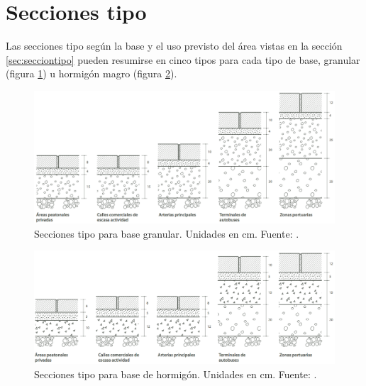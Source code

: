 \section{Secciones tipo}

Las secciones tipo según la base y el uso previsto del área vistas en la sección \ref{sec:secciontipo} pueden resumirse en cinco tipos para cada tipo de base, granular (figura \ref{fig:seccionestipogranular}) u hormigón magro (figura \ref{fig:seccionestipohormigon}).

\begin{figure}[!htb]
\centering
\includegraphics[width=15cm]{seccionestipo_1.png}
\caption[Secciones tipo para base granular.]{Secciones tipo para base granular. Unidades en cm. Fuente: \cite{fenollar}.}
\label{fig:seccionestipogranular}
\end{figure}

\begin{figure}[!htb]
\centering
\includegraphics[width=15cm]{seccionestipo_2.png}
\caption[Secciones tipo para base de hormigón.]{Secciones tipo para base de hormigón. Unidades en cm. Fuente: \cite{fenollar}.}
\label{fig:seccionestipohormigon}
\end{figure}
